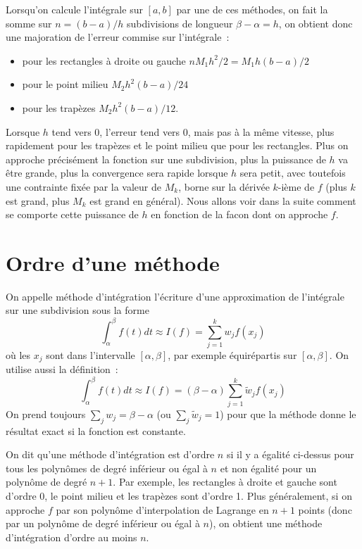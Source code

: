 \documentclass[a4paper,11pt]{book}
\begin{document}
\begin{giacjshere}
Lorsqu'on calcule l'intégrale sur $[a,b]$ par une de ces méthodes,
on fait la somme sur $n=(b-a)/h$ subdivisions de longueur 
$\beta-\alpha=h$, on obtient
donc une majoration de l'erreur commise sur l'intégrale~:
\begin{itemize}
\item pour les rectangles à droite ou gauche $nM_1h^2/2=M_1 h (b-a)/2$
\item pour le point milieu $M_2 h^2 (b-a)/24$
\item pour les trapèzes $M_2h^2 (b-a)/12$.
\end{itemize}
Lorsque $h$ tend vers 0, l'erreur tend vers 0, mais pas à la même vitesse,
plus rapidement pour les trapèzes et le point milieu
que pour les rectangles. Plus on
approche précisément la fonction sur une subdivision, plus la
puissance de $h$ va être grande, plus la convergence sera rapide
lorsque $h$ sera petit, avec toutefois une contrainte fixée par la
valeur de $M_k$, borne sur la dérivée $k$-ième de $f$ (plus
$k$ est grand, plus $M_k$ est grand en général). Nous allons voir dans la suite
comment se comporte cette puissance de $h$ en fonction de la facon
dont on approche $f$.

\section{Ordre d'une méthode} 
On appelle méthode d'intégration l'écriture d'une approximation
de l'intégrale sur une subdivision sous la forme
\[ \int_{\alpha}^{\beta} f(t) dt \approx I(f)=\sum_{j=1}^k w_j f(x_j) \]
où les $x_j$ sont dans l'intervalle $[\alpha,\beta]$, par exemple équirépartis
sur $[\alpha,\beta]$. On utilise aussi la d\'efinition~:
\[ \int_{\alpha}^{\beta} f(t) dt \approx I(f)=
(\beta-\alpha)\sum_{j=1}^k \tilde{w}_j f(x_j) \]
On prend toujours $\sum_j w_j=\beta-\alpha$ (ou $\sum_j \tilde{w}_j=1$) pour
que la m\'ethode donne le r\'esultat exact si la fonction est constante.

On dit qu'une méthode d'intégration est d'ordre $n$ si il y a égalité
ci-dessus pour tous les polynômes de degré inférieur ou \'egal à $n$
et non \'egalit\'e pour un polyn\^ome de degr\'e $n+1$.
Par exemple, les rectangles à droite et gauche sont d'ordre 0, 
le point milieu et les trap\`ezes sont d'ordre 1. Plus
g\'en\'eralement, si on approche $f$ par son polyn\^ome
d'interpolation de Lagrange en $n+1$ points (donc par un polyn\^ome
de degr\'e inf\'erieur ou \'egal \`a $n$), on obtient une m\'ethode
d'int\'egration d'ordre au moins $n$.


\end{giacjshere}
\end{document}
